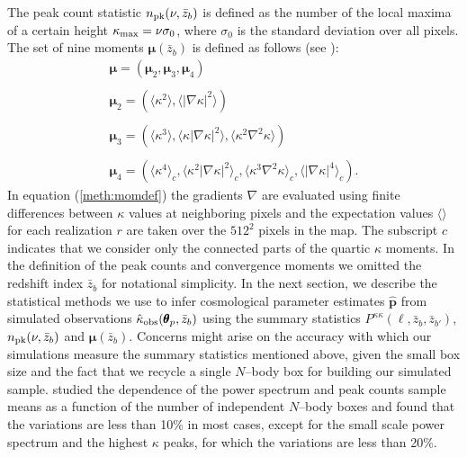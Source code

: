 \documentclass[reprint,aps,prd,superscriptaddress,showkeys,showpacs]{revtex4-1}
\newcommand{\bbh}[1]{\mathbf{\hat{#1}}}
\newcommand{\h}[1]{\hat{#1}}
\begin{document}
The peak count statistic $n_{\rm pk}(\nu,\bar{z}_b)$ is defined as the number of the local maxima of a certain height $\kappa_{\rm max}=\nu\sigma_0$, where $\sigma_0$ is the standard deviation over all pixels. The set of nine moments $\pmb{\mu}(\bar{z}_b)$ is defined as follows (see \citep{Matsubara10,Munshi12,MinkPetri}): 
%
\begin{equation}
\label{meth:momdef}
\begin{matrix}
\pmb{\mu} = (\pmb{\mu}_2,\pmb{\mu}_3,\pmb{\mu}_4) \\ \\
\pmb{\mu}_2 = (\langle\kappa^2\rangle,\langle\vert\nabla\kappa\vert^2\rangle) \\ \\
\pmb{\mu}_3 = (\langle\kappa^3\rangle,\langle\kappa\vert\nabla\kappa\vert^2\rangle,\langle\kappa^2\nabla^2\kappa\rangle) \\ \\
\pmb{\mu}_4 = (\langle\kappa^4\rangle_c,\langle\kappa^2\vert\nabla\kappa\vert^2\rangle_c,\langle\kappa^3\nabla^2\kappa\rangle_c,\langle\vert\nabla\kappa\vert^4\rangle_c) .
\end{matrix}
\end{equation}
%
In equation (\ref{meth:momdef}) the gradients $\nabla$ are evaluated using finite differences between $\kappa$ values at neighboring pixels and the expectation values $\langle\rangle$ for each realization $r$ are taken over the $512^2$ pixels in the map. The subscript $c$ indicates that we consider only the connected parts of the quartic $\kappa$ moments. In the definition of the peak counts and convergence moments we omitted the redshift index $\bar{z}_b$ for notational simplicity. In the next section, we describe the statistical methods we use to infer cosmological parameter estimates $\bbh{p}$ from simulated observations $\h{\kappa}_{\rm obs}(\pmb{\theta}_p,\bar{z}_b)$ using the summary statistics $P^{\kappa\kappa}(\ell,\bar{z}_b,\bar{z}_{b'})$, $n_{\rm pk}(\nu,\bar{z}_b)$ and $\pmb{\mu}(\bar{z}_b)$. Concerns might arise on the accuracy with which our simulations measure the summary statistics mentioned above, given the small box size and the fact that we recycle a single $N$--body box for building our simulated sample. \citep{PetriVariance} studied the dependence of the power spectrum and peak counts sample means as a function of the number of independent $N$--body boxes and found that the variations are less than 10\% in most cases, except for the small scale power spectrum and the highest $\kappa$ peaks, for which the variations are less than 20\%. 
\end{document}
